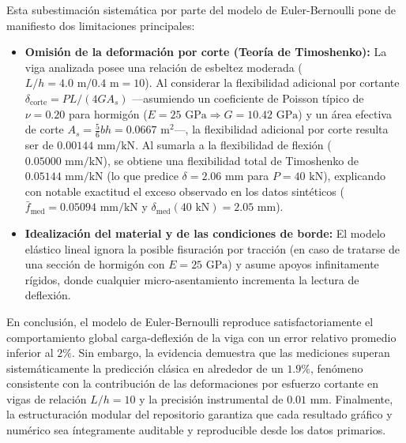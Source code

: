 \documentclass[11pt,a4paper]{article}
\begin{document}
Esta subestimación sistemática por parte del modelo de Euler-Bernoulli pone de manifiesto dos limitaciones principales:
\begin{itemize}
    \item \textbf{Omisión de la deformación por corte (Teoría de Timoshenko):} La viga analizada posee una relación de esbeltez moderada ($L/h = 4.0\text{ m} / 0.4\text{ m} = 10$). Al considerar la flexibilidad adicional por cortante $\delta_{\text{corte}} = P L / (4 G A_s)$ \cite{gere2013mecanica} ---asumiendo un coeficiente de Poisson típico de $\nu = 0.20$ para hormigón ($E = 25\text{ GPa} \Rightarrow G = 10.42\text{ GPa}$) y un área efectiva de corte $A_s = \frac{5}{6}bh = 0.0667\text{ m}^2$---, la flexibilidad adicional por corte resulta ser de $0.00144\text{ mm/kN}$. Al sumarla a la flexibilidad de flexión ($0.05000\text{ mm/kN}$), se obtiene una flexibilidad total de Timoshenko de $0.05144\text{ mm/kN}$ (lo que predice $\delta = 2.06\text{ mm}$ para $P = 40\text{ kN}$), explicando con notable exactitud el exceso observado en los datos sintéticos ($\bar{f}_{\text{med}} = 0.05094\text{ mm/kN}$ y $\delta_{\text{med}}(40\text{ kN}) = 2.05\text{ mm}$).
    \item \textbf{Idealización del material y de las condiciones de borde:} El modelo elástico lineal ignora la posible fisuración por tracción (en caso de tratarse de una sección de hormigón con $E = 25\text{ GPa}$) y asume apoyos infinitamente rígidos, donde cualquier micro-asentamiento incrementa la lectura de deflexión.
\end{itemize}

En conclusión, el modelo de Euler-Bernoulli reproduce satisfactoriamente el comportamiento global carga-deflexión de la viga con un error relativo promedio inferior al $2\%$. Sin embargo, la evidencia demuestra que las mediciones superan sistemáticamente la predicción clásica en alrededor de un $1.9\%$, fenómeno consistente con la contribución de las deformaciones por esfuerzo cortante en vigas de relación $L/h = 10$ y la precisión instrumental de $0.01\text{ mm}$. Finalmente, la estructuración modular del repositorio garantiza que cada resultado gráfico y numérico sea íntegramente auditable y reproducible desde los datos primarios.
\end{document}
